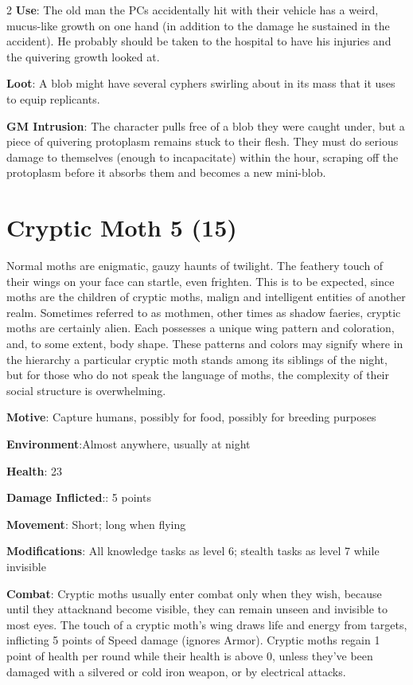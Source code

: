 \begin{multicols}{2}
\textbf{Use}: The old man the PCs accidentally hit with their vehicle has a weird, mucus-like growth on one hand (in addition to the damage he sustained in the accident). He probably should be taken to the hospital to have his injuries and the quivering growth looked at.

\textbf{Loot}: A blob might have several cyphers swirling about in its mass that it uses to equip replicants.

\textbf{GM Intrusion}: The character pulls free of a blob they were caught under, but a piece of quivering protoplasm remains stuck to their flesh. They must do serious damage to themselves (enough to incapacitate) within the hour, scraping off the protoplasm before it absorbs them and becomes a new mini-blob.

\section{Cryptic Moth 5 (15)}

Normal moths are enigmatic, gauzy haunts of twilight. The feathery touch of their wings on your face can startle, even frighten. This is to be expected, since moths are the children of cryptic moths, malign and intelligent entities of another realm. Sometimes referred to as mothmen, other times as shadow faeries, cryptic moths are certainly alien. Each possesses a unique wing pattern and coloration, and, to some extent, body shape. These patterns and colors may signify where in the hierarchy a particular cryptic moth stands among its siblings of the night, but for those who do not speak the language of moths, the complexity of their social structure is overwhelming.

\textbf{Motive}: Capture humans, possibly for food, possibly for breeding purposes

\textbf{Environment}:Almost anywhere, usually at night

\textbf{Health}: 23

\textbf{Damage Inflicted}:: 5 points

\textbf{Movement}: Short; long when flying

\textbf{Modifications}: All knowledge tasks as level 6; stealth tasks as level 7 while invisible 

\textbf{Combat}: Cryptic moths usually enter combat only when they wish, because until they attacknand become visible, they can remain unseen and invisible to most eyes. The touch of a cryptic moth’s wing draws life and energy from targets, inflicting 5 points of Speed damage (ignores Armor).
Cryptic moths regain 1 point of health per round while their health is above 0, unless they’ve been damaged with a silvered or cold iron weapon, or by electrical attacks. 


\end{multicols}
